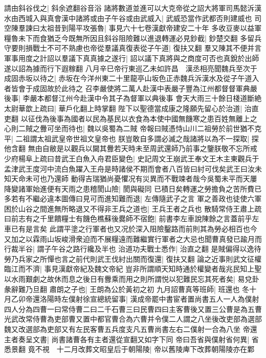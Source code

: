 請由斜谷伐之|{
	斜余遮翻谷音浴}
諸將數道並進可以大克帝從之詔大將軍司馬懿泝漢水由西城入與真會漢中諸將或由子午谷或由武威入|{
	武威恐當作武都否則建威也}
司空陳羣諫曰太祖昔到陽平攻張魯|{
	事見六十七卷漢獻帝建安二十年}
多收豆麥以益軍糧魯未下而食猶乏今既無所因且斜谷阻險難以進退轉運必見鈔截|{
	鈔楚交翻}
多留兵守要則損戰士不可不熟慮也帝從羣議真復表從子午道|{
	復扶又翻}
羣又陳其不便并言軍事用度之計詔以羣議下真真據之遂行|{
	詔以議下真將與之商度可否也真銳於出師遂以詔為據而行下遐稼翻}
八月辛巳帝行東巡乙未如許昌　漢丞相亮聞魏兵至次于成固赤坂以待之|{
	赤坂在今洋州東二十里龍亭山坂色正赤魏兵泝漢水及從子午道入者皆會于成固故於此待之}
召李嚴使將二萬人赴漢中表嚴子豐為江州都督督軍典嚴後事|{
	李嚴本都督江州今赴漢中令其子為督軍以典後事}
會天大雨三十餘日棧道斷絶太尉華歆上疏曰|{
	華戶化翻上時掌翻}
陛下以聖德當成康之隆願先留心於治道|{
	治直吏翻}
以征伐為後事為國者以民為基民以衣食為本使中國無饑寒之患百姓無離上之心則二賊之釁可坐而待也|{
	魏以吳蜀為二賊}
帝報曰賊憑恃山川二祖勞於前世猶不克平|{
	二祖謂太祖武皇帝世祖文皇帝也}
朕豈敢自多謂必滅之哉諸將以為不一探取|{
	探他含翻}
無由自敝是以觀兵以闚其釁若天時未至周武還師乃前事之鑒朕敬不忘所戒少府楊阜上疏曰昔武王白魚入舟君臣變色|{
	史記周文王崩武王奉文王木主東觀兵于孟津武王度河中流白魚躍入王舟是時諸侯不期而會者八百皆曰紂可伐矣武王曰汝未知天命未可也乃還師}
動得吉瑞猶尚憂懼况有災異而不戰竦者哉今吳蜀未平而天屢降變諸軍始進便有天雨之患稽閡山險|{
	閡與礙同}
已積日矣轉運之勞擔負之苦所費已多若有不繼必違本圖傳曰見可而進知難而退|{
	左傳隨武子之言}
軍之善政也徒使六軍困於山谷之間進無所略退又不得非王兵之道也|{
	王兵王者之兵也}
散騎常侍王肅上疏曰前志有之千里饋糧士有饑色樵蘇後爨師不宿飽|{
	前書李左車說陳餘之言蓋前乎左車已有是言矣}
此謂平塗之行軍者也又况於深入阻險鑿路而前則其為勞必相百也今又加之以霖雨山坂峻滑衆迫而不展糧遠而難繼實行軍者之大忌也聞曹真發已踰月而行裁半谷|{
	謂子午谷之路行纔及半也}
治道功夫戰士悉作|{
	治直之翻}
是賊偏得以逸待勞乃兵家之所憚也言之前代則武王伐紂出關而復還|{
	復扶又翻}
論之近事則武文征權臨江而不濟|{
	事見漢獻帝紀及魏文帝紀}
豈非所謂順天知時通於權變者哉兆民知上聖以水雨艱劇之故休而息之後日有釁乘而用之則所謂悦以犯難民忘其死者矣|{
	易兌卦彖辭難乃旦翻}
肅朗之子也|{
	王朗為公於黃初之初}
九月詔曹真等班師|{
	班還也}
冬十月乙卯帝還洛陽時左僕射徐宣總統留事|{
	漢成帝罷中書宦者置尚書五人一人為僕射四人分為四曹一曰常侍曹二曰二千石曹三曰民曹四曰主客曹後又置三公曹是為五曹光武改常侍曹為吏部曹又置中都官曹合為六曹并令僕二人謂之八坐後改吏部為選部魏又改選部為吏部又有左民客曹五兵度支凡五曹尚書左右二僕射一合為八坐}
帝還主者奏呈文書|{
	尚書諸曹各有主者還從宣翻又如字下同}
帝曰吾省與僕射省何異|{
	省悉景翻}
竟不視　十二月改葬文昭皇后于朝陽陵|{
	帝以舊陵庳下改葬朝陽陵亦在鄴}
